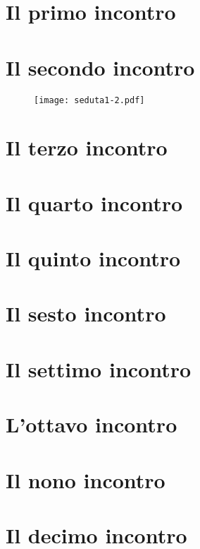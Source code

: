\newpage
\section{Il primo incontro}
\label{s:incontro1}


\newpage
\section{Il secondo incontro}
\label{s:incontro2}


\begin{figure} 
\label{fig:seduta1-2}
\begin{fullwidth}
\texttt{[image: seduta1-2.pdf]}
\end{fullwidth}
\end{figure}

\newpage
\section{Il terzo incontro}
\label{s:incontro3}


\newpage
\section{Il quarto incontro}
\label{s:incontro4}


\newpage
\section{Il quinto incontro}
\label{s:incontro5}


\newpage
\section{Il sesto incontro}
\label{s:incontro6}


\newpage
\section{Il settimo incontro}
\label{s:incontro7}


\newpage
\section{L'ottavo incontro}
\label{s:incontro8}


\newpage
\section{Il nono incontro}
\label{s:incontro9}


\newpage
\section{Il decimo incontro}
\label{s:incontro10}

